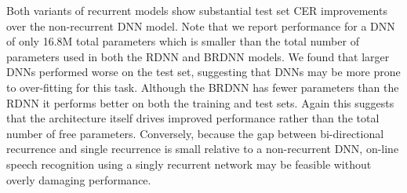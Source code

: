 Both variants of recurrent models show substantial test set CER improvements
over the non-recurrent DNN model. Note that we report performance for a DNN of
only 16.8M total parameters which is smaller than the total number of
parameters used in both the RDNN and BRDNN models. We found that larger DNNs
performed worse on the test set, suggesting that DNNs may be more prone to
over-fitting for this task. Although the BRDNN has fewer parameters than the
RDNN it performs better on both the training and test sets. Again this suggests
that the architecture itself drives improved performance rather than the total
number of free parameters. Conversely, because the gap between bi-directional
recurrence and single recurrence is small relative to a non-recurrent DNN,
on-line speech recognition using a singly recurrent network may be feasible
without overly damaging performance.
